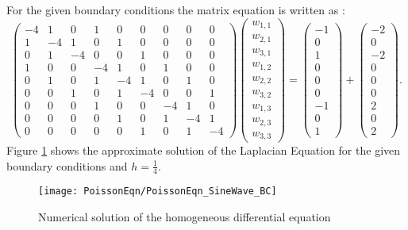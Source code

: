 For the given boundary conditions the matrix equation is written as :
\[\left(\begin{array}{ccccccccc}
-4& 1 & 0 &1 &0 &0 &0 &0 &0\\
1&-4& 1 & 0 &1 &0 &0 &0 &0 \\
0 &1&-4&  0&0 &1 &0 &0 &0 \\
1 &0 &0 &-4& 1 & 0 &1 &0 &0\\
0 & 1 &0 &1&-4& 1 &0 &1 &0  \\
0 &0 &1 &0 &1&-4&0&  0 &1  \\
0&0&0&1 &0 &0 &-4& 1 & 0\\
0&0&0&0 & 1 &0 &1&-4& 1   \\
0&0&0&0 &0 &1 &0 &1&-4
\end{array}\right)
\left(\begin{array}{c}
w_{1,1}\\
w_{2,1}\\
w_{3,1}\\
w_{1,2}\\
w_{2,2}\\
w_{3,2}\\
w_{1,3}\\
w_{2,3}\\
w_{3,3}
\end{array}\right)=
\left(\begin{array}{c}
-1\\
0\\
1\\
0\\
0\\
0\\
-1\\
0\\
1
\end{array}\right)
+\left(\begin{array}{c}
-2\\
0\\
-2\\
0\\
0\\
0\\
2\\
0\\
2
\end{array}\right).
\]	
Figure \ref{SolPossLap} shows the approximate solution of the Laplacian Equation for the given boundary conditions and $h=\frac{1}{4}$.
\begin{figure}[H]
  \caption{Numerical solution of the homogeneous differential equation }\label{SolPossLap}
  \centering
    \texttt{[image: PoissonEqn/PoissonEqn\_SineWave\_BC]}
\end{figure}

